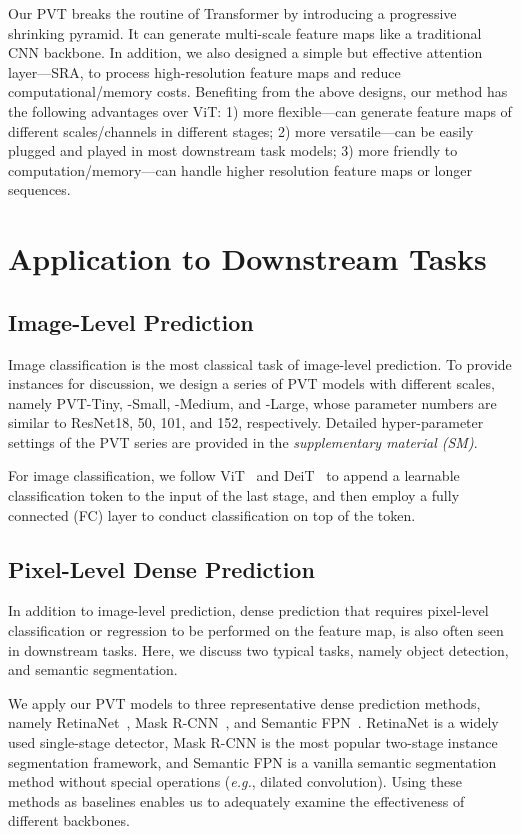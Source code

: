 \documentclass[10pt,twocolumn,letterpaper]{article}
\def\eg{\emph{e.g.}}
\begin{document}
Our PVT breaks the routine of Transformer by introducing a progressive shrinking pyramid.
%
It can generate multi-scale feature maps like a traditional CNN backbone.
%
In addition, we also designed a simple but
effective attention layer---SRA, to process high-resolution feature maps and reduce computational/memory costs.
%
Benefiting from the above designs, our method has the following advantages over ViT:
1) more flexible---can generate feature maps of different scales/channels in different stages;
2) more versatile---can be easily plugged and played in most downstream task models;
3) more friendly to computation/memory---can handle higher resolution feature maps or longer sequences.

%


\section{Application to Downstream Tasks}\label{sec:task}

\subsection{Image-Level Prediction}


Image classification is the most classical task of image-level prediction.
%
To provide instances for discussion, we design a series of PVT models with different scales, namely PVT-Tiny, -Small, -Medium, and -Large, whose parameter numbers are similar to ResNet18, 50, 101, and 152, respectively.
%
Detailed hyper-parameter settings of the PVT series are provided in the \emph{supplementary material (SM)}.

For image classification, we follow ViT~\cite{dosovitskiy2020image} and DeiT~\cite{touvron2020training} to append a learnable classification token to the input of the last stage, and then employ a fully connected (FC) layer to conduct classification on top of the token.


\subsection{Pixel-Level Dense Prediction}

In addition to image-level prediction, dense prediction that requires pixel-level classification or regression to be performed on the feature map, is also often seen in downstream tasks.
Here, we discuss two typical tasks, namely object detection, and semantic segmentation.

%
We apply our PVT models to three representative dense prediction methods, namely RetinaNet~\cite{lin2017focal}, Mask R-CNN~\cite{he2017mask}, and Semantic FPN~\cite{kirillov2019panoptic}.
RetinaNet is a widely used single-stage detector, Mask R-CNN is the most popular two-stage instance segmentation framework, and Semantic FPN is a vanilla semantic segmentation method without special operations (\eg, dilated convolution).
Using these methods as baselines enables us to adequately examine the effectiveness of different backbones.
\end{document}
